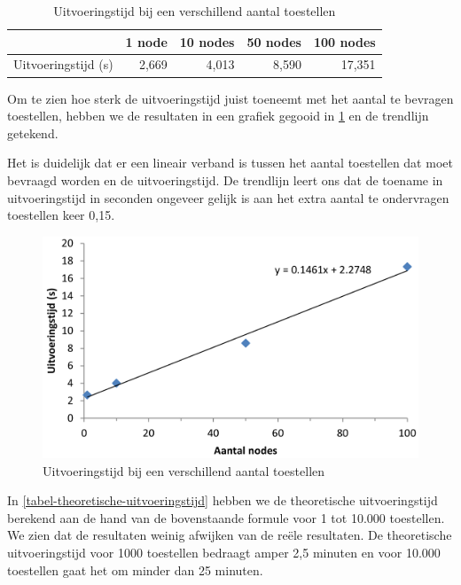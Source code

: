 \begin{table}[h]
\centering
\begin{tabular}{@{}lrrrr@{}}
\toprule
                    & 1 node & 10 nodes & 50 nodes & 100 nodes \\ \midrule
Uitvoeringstijd (s) & 2,669  & 4,013    & 8,590    & 17,351    \\ \bottomrule
\end{tabular}
\caption{Uitvoeringstijd bij een verschillend aantal toestellen}
\label{tabel-uitvoeringstijd-aantalnodes}
\end{table}

Om te zien hoe sterk de uitvoeringstijd juist toeneemt met het aantal te bevragen toestellen,
hebben we de resultaten in een grafiek gegooid in \cref{fig-uitvoeringstijd} en de trendlijn getekend.

Het is duidelijk dat er een lineair verband is tussen het aantal toestellen dat moet bevraagd worden en de uitvoeringstijd.
De trendlijn leert ons dat de toename in uitvoeringstijd in seconden ongeveer gelijk is aan het extra aantal te ondervragen toestellen keer 0,15.

\begin{figure}[h]
	\centering
	\includegraphics[scale=0.40]{figures/uitvoeringstijd}
	\caption{Uitvoeringstijd bij een verschillend aantal toestellen}
	\label{fig-uitvoeringstijd}
\end{figure}

In \cref{tabel-theoretische-uitvoeringstijd} hebben we de theoretische uitvoeringstijd berekend aan de hand van de bovenstaande formule voor 1 tot 10.000 toestellen.
We zien dat de resultaten weinig afwijken van de reële resultaten.
De theoretische uitvoeringstijd voor 1000 toestellen bedraagt amper 2,5 minuten en voor 10.000 toestellen gaat het om minder dan 25 minuten.

